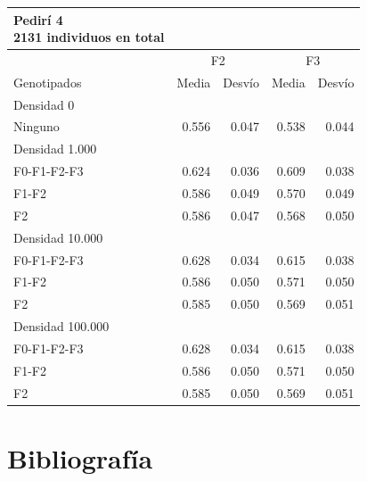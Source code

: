 \documentclass[11pt,spanish,a4paper,oneside,]{book} %
\begin{document}
\begin{longtable}{lrrrr}
\caption*{
{\large Pedirí 4} \\ 
{\small 2131 individuos en total}
} \\ 
\toprule
 & \multicolumn{2}{c}{F2} & \multicolumn{2}{c}{F3} \\ 
 \cmidrule(lr){2-3} \cmidrule(lr){4-5}
Genotipados & Media & Desvío & Media & Desvío \\ 
\midrule
\multicolumn{1}{l}{Densidad 0} \\ 
\midrule
Ninguno & 0.556 & 0.047 & 0.538 & 0.044 \\ 
\midrule
\multicolumn{1}{l}{Densidad 1.000} \\ 
\midrule
F0-F1-F2-F3 & 0.624 & 0.036 & 0.609 & 0.038 \\ 
F1-F2 & 0.586 & 0.049 & 0.570 & 0.049 \\ 
F2 & 0.586 & 0.047 & 0.568 & 0.050 \\ 
\midrule
\multicolumn{1}{l}{Densidad 10.000} \\ 
\midrule
F0-F1-F2-F3 & 0.628 & 0.034 & 0.615 & 0.038 \\ 
F1-F2 & 0.586 & 0.050 & 0.571 & 0.050 \\ 
F2 & 0.585 & 0.050 & 0.569 & 0.051 \\ 
\midrule
\multicolumn{1}{l}{Densidad 100.000} \\ 
\midrule
F0-F1-F2-F3 & 0.628 & 0.034 & 0.615 & 0.038 \\ 
F1-F2 & 0.586 & 0.050 & 0.571 & 0.050 \\ 
F2 & 0.585 & 0.050 & 0.569 & 0.051 \\ 
 \bottomrule
\end{longtable}

\backmatter

\hypertarget{bibliografuxeda}{%
\chapter*{Bibliografía}\label{bibliografuxeda}}

\begingroup
\hspace{\parindent}
\setlength{\parindent}{-0.25in}
\setlength{\leftskip}{0.25in}
\setlength{\parskip}{0pt}
\end{document}
